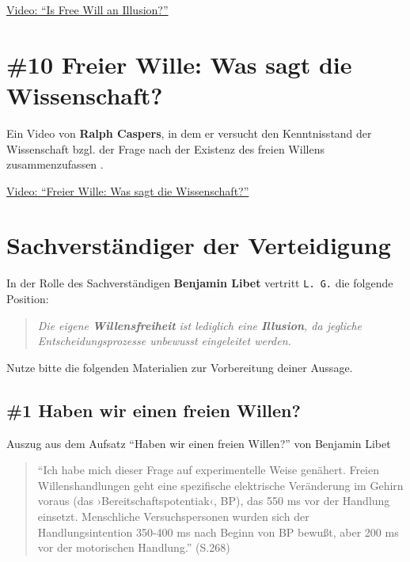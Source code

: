 \documentclass[
  a4paper,
]{report}
\begin{document}
\href{https://www.youtube.com/watch?v=J21bSGGvnD4}{Video: ``Is Free Will an Illusion?''}

\hypertarget{def-ev10}{%
\section{\#10 Freier Wille: Was sagt die Wissenschaft?}\label{def-ev10}}

Ein Video von \textbf{Ralph Caspers}, in dem er versucht den Kenntnisstand der Wissenschaft bzgl. der Frage nach der Existenz des freien Willens zusammenzufassen \citep{Caspers2021}.

\href{https://www.youtube.com/watch?v=45Iut50Cm_Q}{Video: ``Freier Wille: Was sagt die Wissenschaft?''}

\hypertarget{def-expert}{%
\section{Sachverständiger der Verteidigung}\label{def-expert}}

In der Rolle des Sachverständigen \textbf{Benjamin Libet} vertritt \texttt{L.\ G.} die folgende Position:

\begin{quote}
\emph{Die eigene \textbf{Willensfreiheit} ist lediglich eine \textbf{Illusion}, da jegliche Entscheidungsprozesse unbewusst eingeleitet werden.}
\end{quote}

Nutze bitte die folgenden Materialien zur Vorbereitung deiner Aussage.

\hypertarget{def-expert-ev1}{%
\subsection{\#1 Haben wir einen freien Willen?}\label{def-expert-ev1}}

Auszug aus dem Aufsatz ``Haben wir einen freien Willen?'' von Benjamin Libet \citeyearpar{Libet2004}

\begin{quote}
``Ich habe mich dieser Frage auf experimentelle Weise genähert. Freien Willenshandlungen geht eine spezifische elektrische Veränderung im Gehirn voraus (das ›Bereitschaftspotentiak‹, BP), das 550 ms vor der Handlung einsetzt. Menschliche Versuchspersonen wurden sich der Handlungsintention 350-400 ms nach Beginn von BP bewußt, aber 200 ms vor der motorischen Handlung.'' (S.268)
\end{quote}
\end{document}
